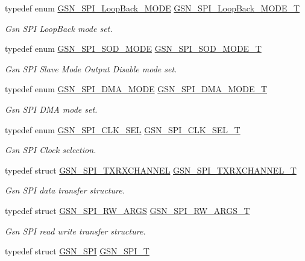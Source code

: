 \begin{DoxyCompactItemize}
typedef enum \hyperlink{a00655_ga64d5d284cb01ecc3c94f83cd0b22fea0}{GSN\_\-SPI\_\-LoopBack\_\-MODE} \hyperlink{a00655_ga6f83091cbd86860cdb531eb6c520660e}{GSN\_\-SPI\_\-LoopBack\_\-MODE\_\-T}
\begin{DoxyCompactList}\small\item\em Gsn SPI LoopBack mode set. \end{DoxyCompactList}\item 
typedef enum \hyperlink{a00655_gad8f5cb14958ae6607aad0159bf3dc5b4}{GSN\_\-SPI\_\-SOD\_\-MODE} \hyperlink{a00655_ga5662413f1ff6b81e835e7c5412916d4b}{GSN\_\-SPI\_\-SOD\_\-MODE\_\-T}
\begin{DoxyCompactList}\small\item\em Gsn SPI Slave Mode Output Disable mode set. \end{DoxyCompactList}\item 
typedef enum \hyperlink{a00655_ga5877a1a4dee99757a5560a974edd42ca}{GSN\_\-SPI\_\-DMA\_\-MODE} \hyperlink{a00655_gafff743b26bbfafb380a9797457935a0e}{GSN\_\-SPI\_\-DMA\_\-MODE\_\-T}
\begin{DoxyCompactList}\small\item\em Gsn SPI DMA mode set. \end{DoxyCompactList}\item 
typedef enum \hyperlink{a00655_ga26d561511c040815639b118310656f40}{GSN\_\-SPI\_\-CLK\_\-SEL} \hyperlink{a00655_gac4a300710a224a1971e5a78eae8eb89e}{GSN\_\-SPI\_\-CLK\_\-SEL\_\-T}
\begin{DoxyCompactList}\small\item\em Gsn SPI Clock selection. \end{DoxyCompactList}\item 
typedef struct \hyperlink{a00241}{GSN\_\-SPI\_\-TXRXCHANNEL} \hyperlink{a00655_ga0cdbeb0b657e6192938aebc1aaf793de}{GSN\_\-SPI\_\-TXRXCHANNEL\_\-T}
\begin{DoxyCompactList}\small\item\em Gsn SPI data transfer structure. \end{DoxyCompactList}\item 
typedef struct \hyperlink{a00239}{GSN\_\-SPI\_\-RW\_\-ARGS} \hyperlink{a00655_ga9da696c71bee0cdc5b3365d5d055e389}{GSN\_\-SPI\_\-RW\_\-ARGS\_\-T}
\begin{DoxyCompactList}\small\item\em Gsn SPI read write transfer structure. \end{DoxyCompactList}\item 
typedef struct \hyperlink{a00230}{GSN\_\-SPI} \hyperlink{a00655_ga18a5a1252fa65289699c9caa71d05fca}{GSN\_\-SPI\_\-T}

\end{DoxyCompactItemize}
